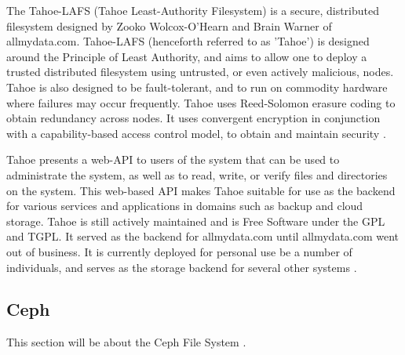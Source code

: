\documentclass[11pt]{article}
\begin{document}
The Tahoe-LAFS (Tahoe Least-Authority Filesystem) is a secure,
distributed filesystem designed by Zooko Wolcox-O'Hearn and Brain
Warner of allmydata.com. Tahoe-LAFS (henceforth referred to as
'Tahoe') is designed around the Principle of Least Authority, and aims
to allow one to deploy a trusted distributed filesystem using
untrusted, or even actively malicious, nodes. Tahoe is also designed
to be fault-tolerant, and to run on commodity hardware where failures
may occur frequently. Tahoe uses Reed-Solomon erasure coding to obtain
redundancy across nodes. It uses convergent encryption in conjunction
with a capability-based access control model, to obtain and maintain
security \cite{WilcoxOHearn:2008p1275}.

Tahoe presents a web-API to users of the system that can be used to
administrate the system, as well as to read, write, or verify files
and directories on the system. This web-based API makes Tahoe suitable
for use as the backend for various services and applications in
domains such as backup and cloud storage. Tahoe is still actively
maintained and is Free Software under the GPL and TGPL. It served as the
backend for allmydata.com until allmydata.com went out of business. It
is currently deployed for personal use be a number of individuals, and
serves as the storage backend for several other
systems \cite{tahoe-lafs.org}. 

\subsection{Ceph}
This section will be about the Ceph File System
\cite{Weil:2012p1035,Weil:2012p1010,Weil:2006p1273}.

\nocite{*}

\end{document}

